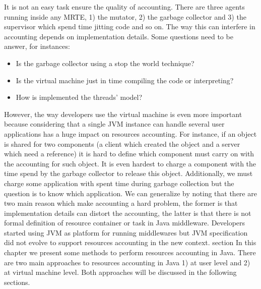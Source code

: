 It is not an easy task ensure the quality of accounting. There are three agents running inside any MRTE, 1) the mutator, 2) the garbage collector and 3) the supervisor which spend time jitting code and so on. The way this can interfere in accounting depends on implementation details. Some questions need to be answer, for instances:
\begin{itemize}
\item Is the garbage collector using a stop the world technique?
\item Is the virtual machine just in time compiling the code or interpreting?
\item How is implemented the threads' model?
\end{itemize}
However, the way developers use the virtual machine is even more important because considering that a single JVM instance can handle several user applications has a huge impact on resources accounting. For instance, if an object is shared for two components (a client which created the object and a server which need a reference) it is hard to define which component must carry on with the accounting for such object. It is even hardest to charge a component with the time spend by the garbage collector to release this object. Additionally, we must charge some application with spent time during garbage collection but the question is to know which application. We can generalize by noting that there are two main reason which make accounting a hard problem, the former is that implementation details can distort the accounting, the latter is that there is not formal definition of resource container or task in Java middleware. Developers started using JVM as platform for running middlewares but JVM specification did not evolve to support resources accounting in the new context.
section
In this chapter we present some methods to perform resources accounting in Java. There are two main approaches to resources accounting in Java 1) at user level and 2) at virtual machine level. Both approaches will be discussed in the following sections. 


